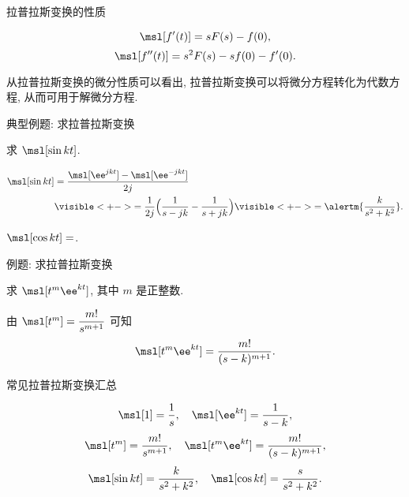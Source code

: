 \begin{frame}{拉普拉斯变换的性质}
	\onslide<+->
	\begin{theorem*}[][微分性质]
	\[
		\msl[f'(t)]=sF(s)-f(0),
	\]
	\[
		\msl[f''(t)]=s^2F(s)-sf(0)-f'(0).
	\]
	\end{theorem*}

	\onslide<+->
	从拉普拉斯变换的微分性质可以看出, 拉普拉斯变换可以将微分方程转化为代数方程, 从而可用于解微分方程.
\end{frame}


\begin{frame}{典型例题: 求拉普拉斯变换}
	\onslide<+->
	\begin{example}
		求 $\msl[\sin{kt}]$.
	\end{example}

	\onslide<+->
	\begin{solution}
		\begin{align*}
			\msl[\sin{kt}]&=\frac{\msl[\ee^{jkt}]-\msl[\ee^{-jkt}]}{2j}\\
			&\visible<+->{=\frac1{2j}\Bigl(\frac1{s-jk}-\frac1{s+jk}\Bigr)}
			\visible<+->{=\alertm{\frac k{s^2+k^2}}.}
		\end{align*}
	\end{solution}

	\onslide<+->
	\begin{exercise}
		$\msl[\cos{kt}]=$.
	\end{exercise}
\end{frame}


\begin{frame}{例题: 求拉普拉斯变换}
	\onslide<+->
	\begin{example}
		求 $\msl[t^m\ee^{kt}]$, 其中 $m$ 是正整数.
	\end{example}

	\onslide<+->
	\begin{solution}
		由 $\msl[t^m]=\dfrac{m!}{s^{m+1}}$ 可知
	\[
		\msl[t^m\ee^{kt}]=\frac{m!}{(s-k)^{m+1}}.
	\]
	\end{solution}
\end{frame}


\begin{frame}{常见拉普拉斯变换汇总}
	\onslide<+->
	\begin{theorem*}[][常见拉普拉斯变换汇总]
	\[
		\msl[1]=\frac1s,\quad \msl[\ee^{kt}]=\frac1{s-k},
	\]
	\[
		\msl[t^m]=\frac{m!}{s^{m+1}},\quad \msl[t^m\ee^{kt}]=\frac{m!}{(s-k)^{m+1}},
	\]
	\[
		\msl[\sin kt]=\frac{k}{s^2+k^2},\quad
		\msl[\cos kt]=\frac{s}{s^2+k^2}.
	\]
	\end{theorem*}
\end{frame}



